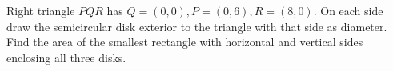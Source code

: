 Right triangle $PQR$ has $Q=(0,0),P=(0,6),R=(8,0)$. On each side draw the semicircular disk exterior to the triangle with that side as diameter. Find the area of the smallest rectangle with horizontal and vertical sides enclosing all three disks.
